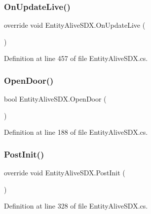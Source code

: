 \subsubsection{\texorpdfstring{OnUpdateLive()}{OnUpdateLive()}}
{\footnotesize\ttfamily override void Entity\+Alive\+S\+D\+X.\+On\+Update\+Live (\begin{DoxyParamCaption}{ }\end{DoxyParamCaption})}



Definition at line 457 of file Entity\+Alive\+S\+D\+X.\+cs.

\mbox{\label{class_entity_alive_s_d_x_ae3cc6fc675963b2d57503f041992e6cc}} 
\subsubsection{\texorpdfstring{OpenDoor()}{OpenDoor()}}
{\footnotesize\ttfamily bool Entity\+Alive\+S\+D\+X.\+Open\+Door (\begin{DoxyParamCaption}{ }\end{DoxyParamCaption})}



Definition at line 188 of file Entity\+Alive\+S\+D\+X.\+cs.

\mbox{\label{class_entity_alive_s_d_x_ad27363e0b5517bfe08dc2f145a0a3b76}} 
\subsubsection{\texorpdfstring{PostInit()}{PostInit()}}
{\footnotesize\ttfamily override void Entity\+Alive\+S\+D\+X.\+Post\+Init (\begin{DoxyParamCaption}{ }\end{DoxyParamCaption})}



Definition at line 328 of file Entity\+Alive\+S\+D\+X.\+cs.

\mbox{\label{class_entity_alive_s_d_x_acc83fe2b48def8b8ebbaa550a94fc2f5}} 
